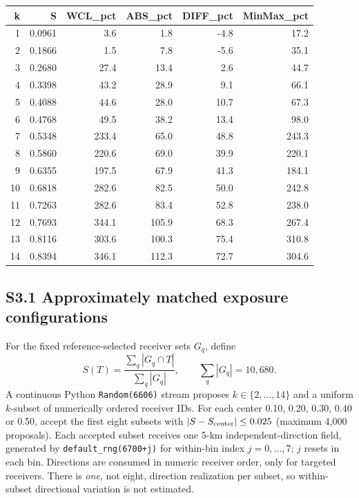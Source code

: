 \documentclass[journal,onecolumn,10pt]{IEEEtran}
\begin{document}
\begin{center}\begin{minipage}{\textwidth}\centering
{}

\begin{tabular}{@{}rrrrrr@{}}
\toprule\noalign{}
k & S & WCL\_pct & ABS\_pct & DIFF\_pct & MinMax\_pct \\
\midrule\noalign{}

1 & 0.0961 & 3.6 & 1.8 & -4.8 & 17.2 \\
2 & 0.1866 & 1.5 & 7.8 & -5.6 & 35.1 \\
3 & 0.2680 & 27.4 & 13.4 & 2.6 & 44.7 \\
4 & 0.3398 & 43.2 & 28.9 & 9.1 & 66.1 \\
5 & 0.4088 & 44.6 & 28.0 & 10.7 & 67.3 \\
6 & 0.4768 & 49.5 & 38.2 & 13.4 & 98.0 \\
7 & 0.5348 & 233.4 & 65.0 & 48.8 & 243.3 \\
8 & 0.5860 & 220.6 & 69.0 & 39.9 & 220.1 \\
9 & 0.6355 & 197.5 & 67.9 & 41.3 & 184.1 \\
10 & 0.6818 & 282.6 & 82.5 & 50.0 & 242.8 \\
11 & 0.7263 & 282.6 & 83.4 & 52.8 & 238.0 \\
12 & 0.7693 & 344.1 & 105.9 & 68.3 & 267.4 \\
13 & 0.8116 & 303.6 & 100.3 & 75.4 & 310.8 \\
14 & 0.8394 & 346.1 & 112.3 & 72.7 & 304.6 \\
\bottomrule
\end{tabular}
\end{minipage}\end{center}

\subsection*{S3.1 Approximately matched exposure configurations}\label{s3.1-matched-exposure-falsifier}

For the fixed reference-selected receiver sets $G_q$, define
\begin{equation}\label{eq:s-exposure}
S(T)=\frac{\sum_q |G_q\cap T|}{\sum_q|G_q|},\qquad \sum_q|G_q|=10{,}680.
\end{equation}
A continuous Python \texttt{Random(6606)} stream proposes $k\in\{2,\ldots,14\}$ and a uniform $k$-subset of numerically ordered receiver IDs. For each center 0.10, 0.20, 0.30, 0.40 or 0.50, accept the first eight subsets with $|S-S_{\rm center}|\le0.025$ (maximum 4,000 proposals). Each accepted subset receives one 5-km independent-direction field, generated by \texttt{default\_rng(6700+j)} for within-bin index $j=0,\ldots,7$; $j$ resets in each bin. Directions are consumed in numeric receiver order, only for targeted receivers. There is \emph{one}, not eight, direction realization per subset, so within-subset directional variation is not estimated.
\end{document}
